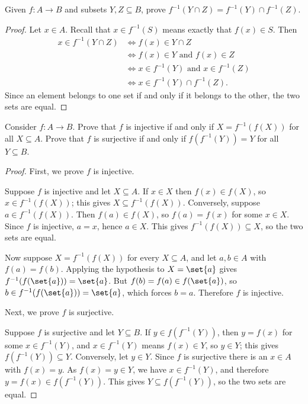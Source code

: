 \documentclass[DIN, pagenumber=false, fontsize=11pt, parskip=half]{scrartcl}
\begin{document}
\begin{problems}
    \problem Given $f : A \to B$ and subsets $Y, Z \subseteq B$, prove $f^{-1}(Y \cap Z) = f^{-1}(Y) \cap f^{-1}(Z)$.
    \begin{proof}
        Let $x \in A$. Recall that $x \in f^{-1}(S)$ means exactly that $f(x) \in S$. Then
        \begin{align*}
            x \in f^{-1}(Y \cap Z)
                &\iff f(x) \in Y \cap Z\\
                &\iff f(x) \in Y \text{ and } f(x) \in Z\\
                &\iff x \in f^{-1}(Y) \text{ and } x \in f^{-1}(Z)\\
                &\iff x \in f^{-1}(Y) \cap f^{-1}(Z).
        \end{align*}
        Since an element belongs to one set if and only if it belongs to the other, the two sets are equal.
    \end{proof}

    \problem Consider $f : A \to B$. Prove that $f$ is injective if and only if $X = f^{-1}(f(X))$ for all $X \subseteq A$. Prove that $f$ is surjective if and only if $f(f^{-1}(Y)) = Y$ for all $Y \subseteq B$.
    \begin{proof}

        First, we prove $f$ is injective.

        Suppose $f$ is injective and let $X \subseteq A$. If $x \in X$ then $f(x) \in f(X)$, so $x \in f^{-1}(f(X))$; this gives $X \subseteq f^{-1}(f(X))$.
        Conversely, suppose $a \in f^{-1}(f(X))$. Then $f(a) \in f(X)$, so $f(a) = f(x)$ for some $x \in X$. Since $f$ is injective, $a = x$, hence $a \in X$. This gives $f^{-1}(f(X)) \subseteq X$, so the two sets are equal.

        Now suppose $X = f^{-1}(f(X))$ for every $X \subseteq A$, and let $a, b \in A$ with $f(a) = f(b)$. Applying the hypothesis to $X = \set{a}$ gives $f^{-1}(f(\set{a})) = \set{a}$. But $f(b) = f(a) \in f(\set{a})$, so $b \in f^{-1}(f(\set{a})) = \set{a}$, which forces $b = a$. Therefore $f$ is injective.

        Next, we prove $f$ is surjective.

        Suppose $f$ is surjective and let $Y \subseteq B$. 
        If $y \in f(f^{-1}(Y))$, then $y = f(x)$ for some $x \in f^{-1}(Y)$, and $x \in f^{-1}(Y)$ means $f(x) \in Y$, so $y \in Y$; this gives $f(f^{-1}(Y)) \subseteq Y$. 
        Conversely, let $y \in Y$. Since $f$ is surjective there is an $x \in A$ with $f(x) = y$. As $f(x) = y \in Y$, we have $x \in f^{-1}(Y)$, and therefore $y = f(x) \in f(f^{-1}(Y))$. This gives $Y \subseteq f(f^{-1}(Y))$, so the two sets are equal.


\end{proof}
\end{problems}
\end{document}
